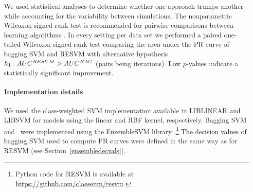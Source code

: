 We used statistical analyses to determine whether one approach trumps another while accounting for the variability between simulations. %
The nonparametric Wilcoxon signed-rank test is recommended for pairwise comparisons between learning algorithms \citep{demvsar2006statistical}. In every setting per data set we performed a paired one-tailed Wilcoxon signed-rank test comparing the area under the PR curve of bagging SVM and RESVM with alternative hypothesis $h_1: AUC^{RESVM} > AUC^{BAG}$ (pairs being iterations). Low $p$-values indicate a statistically significant improvement. 


\paragraph{Implementation details}
We used the class-weighted SVM implementation available in LIBLINEAR \citep{Fan:2008:LLL:1390681.1442794} and LIBSVM \citep{CC01a} for models using the linear and RBF kernel, respectively. Bagging SVM and \resvm\ were implemented using the EnsembleSVM library \citep{ensemblesvm-jmlr}.\footnote{Python code for RESVM is available at \url{https://github.com/claesenm/resvm}.} The decision values of bagging SVM used to compute PR curves were defined in the same way as for RESVM (see Section~\ref{ensembledecvals}).




